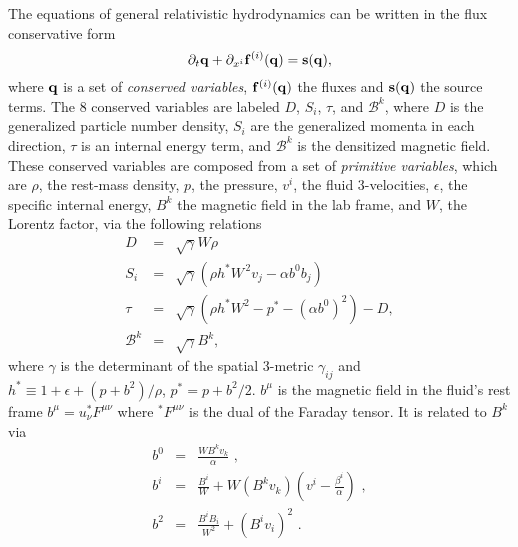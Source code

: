 \documentclass{article}
\begin{document}
The equations of general relativistic hydrodynamics can be written in
the flux conservative form
\begin{equation}
  \label{eq:consform1}
  \partial_t {\bf q} + \partial_{x^i} {\bf f}^{(i)} ({\bf q}) = {\bf
    s} ({\bf q}),
\end{equation}
where ${\bf q}$ is a set of {\it conserved variables}, ${\bf f}^{(i)}
({\bf q})$ the fluxes and ${\bf s} ({\bf q})$ the source
terms.
The 8 conserved variables are labeled $D$, $S_i$, $\tau$, and $\mathcal B^k$,
where
$D$ is the generalized particle number density, $S_i$ are the generalized
momenta in each direction, $\tau$ is an internal energy term, and $\mathcal
B^k$ is the densitized magnetic field.
These conserved variables are composed from a set of {\it primitive variables},
which are $\rho$, the rest-mass density, $p$, the
pressure, $v^i$, the fluid 3-velocities, $\epsilon$, the specific internal
energy, $B^k$ the magnetic field in the lab frame,
and $W$, the Lorentz factor, via the following relations
% 
%
\
\begin{eqnarray}
  \label{eq:prim2con}
   D &=& \sqrt{\gamma}W\rho \nonumber \\
   S_i &=& \sqrt{\gamma} \left(\rho h^* W^{\,2} v_j-\alpha b^0b_j\right) \nonumber \\
   \tau &=& \sqrt{\gamma}\left(\rho h^* W^2 - p^*-(\alpha b^0)^2\right) - D, \nonumber \\
   \mathcal B^k &=& \sqrt{\gamma} B^k,
\end{eqnarray}
where $\gamma$ is the determinant of the spatial 3-metric $\gamma_{ij}$ and 
$h^* \equiv 1+\epsilon+\left(p + b^2\right)/\rho$, $p^* = p + b^2/2$.
$b^\mu$ is the magnetic field in the fluid's rest frame $b^\mu = u_\nu
^*F^{\mu\nu}$ where $^*F^{\mu\nu}$ is the dual of the Faraday tensor. It is
related to $B^k$ via
\begin{eqnarray}
b^0&=&\frac{WB^kv_k}{\alpha}\,\,,\\
b^i&=&\frac{B^i}{W}+W(B^kv_k)\left(v^i-\frac{\beta^i}{\alpha}\right)\,\,,\\
b^2&=&\frac{B^iB_i}{W^2}+(B^iv_i)^2\,\,.
\end{eqnarray}
\end{document}
